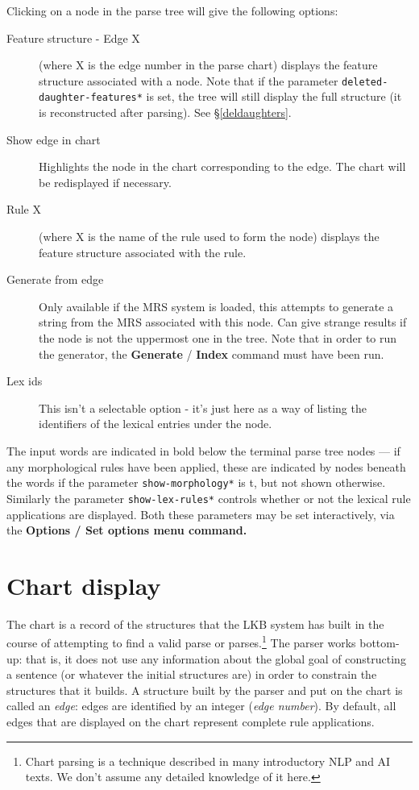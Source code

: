 \documentclass[12pt]{report}
\newcommand{\lkbparam}[1]{{\tt #1}}
\newcommand{\lkbmenucommand}{\bf}
\newcommand{\newterm}[1]{{\it #1}}
\begin{document}
Clicking on a node in the parse tree will
give the following options:
\begin{description}
\item [Feature structure - Edge X]  (where X is the edge number in the
parse chart) displays the feature structure associated
with a node.  Note that if the parameter
\lkbparam{*deleted-daughter-features*} is set, the tree will still
display the full structure (it is reconstructed after parsing).
See \S\ref{deldaughters}.
\item [Show edge in chart] Highlights the node in the chart corresponding to
the edge.  The chart will be redisplayed if necessary.
\item [Rule X] (where X is the name of the
rule used to form the node) 
displays the feature structure associated with the rule.
\item[Generate from edge]  Only available if the MRS system
is loaded, this attempts to generate a string from the 
MRS associated with this node.  Can give strange results
if the node is not the uppermost one in the tree.
Note that
in order to run the generator, 
the {\lkbmenucommand Generate} / {\lkbmenucommand Index}
command must have been run.
\item[Lex ids] This isn't a selectable option - it's just
here as a way of listing
the identifiers of the lexical entries under the node.
\end{description}

The input words are 
indicated in bold below the terminal parse tree nodes --- if any morphological
rules have been applied, these are indicated by nodes beneath the words
if the parameter \lkbparam{*show-morphology*} is t, but not shown otherwise.
Similarly the parameter \lkbparam{*show-lex-rules*} controls whether or
not the lexical rule applications are displayed.  Both these parameters
may be set interactively, via the 
\lkbmenucommand{Options} / \lkbmenucommand{Set options} 
menu command.

\section{Chart display}
\label{chart}

The chart is a record of the structures that the LKB system has built in
the course of attempting to find a valid parse or parses.\footnote{Chart
parsing is a technique
described in many introductory NLP and AI texts.  We don't assume any
detailed knowledge of it here.}
The parser works bottom-up: that is, it does not use any
information about the global goal of constructing a sentence (or
whatever the initial structures 
are) in order to constrain the structures that it
builds.  A structure built by the parser and put on the
chart is called an \newterm{edge}: edges are identified by an
integer (\newterm{edge number}).
By default, all edges that are displayed on the chart 
represent complete rule applications.
\end{document}
